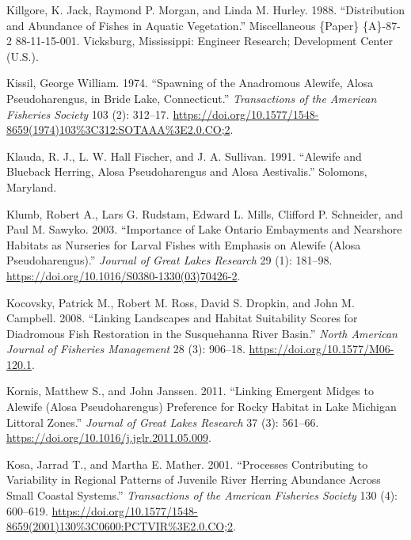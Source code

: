 \documentclass[
]{book}
\newlength{\cslhangindent}
\newlength{\cslentryspacingunit} %
\newenvironment{CSLReferences}[2] %
 {%
  \setlength{\parindent}{0pt}
  \ifodd #1
  \let\oldpar\par
  \def\par{\hangindent=\cslhangindent\oldpar}
  \fi
  \setlength{\parskip}{#2\cslentryspacingunit}
 }%
 {}
\begin{document}
\begin{CSLReferences}{1}{0}
\leavevmode{}%
Killgore, K. Jack, Raymond P. Morgan, and Linda M. Hurley. 1988. {``Distribution and {Abundance} of {Fishes} in {Aquatic} {Vegetation}.''} Miscellaneous \{Paper\} \{A\}-87-2 88-11-15-001. Vicksburg, Mississippi: Engineer Research; Development Center (U.S.).

\leavevmode{}%
Kissil, George William. 1974. {``Spawning of the {Anadromous} {Alewife}, {Alosa} Pseudoharengus, in {Bride} {Lake}, {Connecticut}.''} \emph{Transactions of the American Fisheries Society} 103 (2): 312--17. \url{https://doi.org/10.1577/1548-8659(1974)103\%3C312:SOTAAA\%3E2.0.CO;2}.

\leavevmode{}%
Klauda, R. J., L. W. Hall Fischer, and J. A. Sullivan. 1991. {``Alewife and {Blueback} {Herring}, {Alosa} Pseudoharengus and {Alosa} Aestivalis.''} Solomons, Maryland.

\leavevmode{}%
Klumb, Robert A., Lars G. Rudstam, Edward L. Mills, Clifford P. Schneider, and Paul M. Sawyko. 2003. {``Importance of {Lake} {Ontario} {Embayments} and {Nearshore} {Habitats} as {Nurseries} for {Larval} {Fishes} with {Emphasis} on {Alewife} ({Alosa} Pseudoharengus).''} \emph{Journal of Great Lakes Research} 29 (1): 181--98. \url{https://doi.org/10.1016/S0380-1330(03)70426-2}.

\leavevmode{}%
Kocovsky, Patrick M., Robert M. Ross, David S. Dropkin, and John M. Campbell. 2008. {``Linking {Landscapes} and {Habitat} {Suitability} {Scores} for {Diadromous} {Fish} {Restoration} in the {Susquehanna} {River} {Basin}.''} \emph{North American Journal of Fisheries Management} 28 (3): 906--18. \url{https://doi.org/10.1577/M06-120.1}.

\leavevmode{}%
Kornis, Matthew S., and John Janssen. 2011. {``Linking Emergent Midges to Alewife ({Alosa} Pseudoharengus) Preference for Rocky Habitat in {Lake} {Michigan} Littoral Zones.''} \emph{Journal of Great Lakes Research} 37 (3): 561--66. \url{https://doi.org/10.1016/j.jglr.2011.05.009}.

\leavevmode{}%
Kosa, Jarrad T., and Martha E. Mather. 2001. {``Processes {Contributing} to {Variability} in {Regional} {Patterns} of {Juvenile} {River} {Herring} {Abundance} Across {Small} {Coastal} {Systems}.''} \emph{Transactions of the American Fisheries Society} 130 (4): 600--619. \url{https://doi.org/10.1577/1548-8659(2001)130\%3C0600:PCTVIR\%3E2.0.CO;2}.


\end{CSLReferences}
\end{document}
